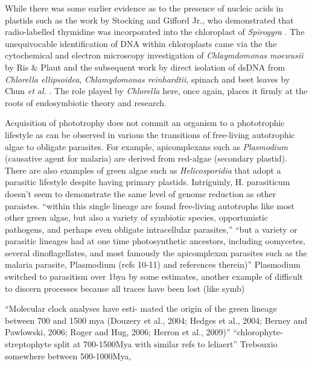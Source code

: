 While there was some earlier evidence as to the presence of nucleic acids in 
plastids such as the work by Stocking and Gifford Jr., who demonstrated that
radio-labelled thymidine was incorporated into the chloroplast of \textit{Spirogyra}
\citep{Stocking1959}.
The unequivocable identification of DNA within chloroplasts came via the 
the cytochemical and electron microscopy investigation of \textit{Chlaymdomonas moewusii} 
by Ris \& Plaut \citep{Ris1962} and the subsequent work by direct isolation of
dsDNA from \textit{Chlorella ellipsoidea}, \textit{Chlamydomonas reinhardtii}, spinach
and beet leaves by Chun \textit{et al.} \citep{Chun1963}. The role played by
\textit{Chlorella} here, once again, places it firmly at the roots of endosymbiotic
theory and research.



Acquisition of phototrophy does not commit an organism to a phototrophic lifestyle
as can be observed in various the transitions of free-living autotrophic algae 
to obligate parasites.  For example, apicomplexans such as \textit{Plasmodium} 
(causative agent for malaria) are derived from red-algae (secondary plastid).
There are also examples of green algae such as \textit{Helicosporidia} that 
adopt a parasitic lifestyle despite having primary plastids. 
Intriguinly, H. parasiticum doesn't seem to demonstrate the same level of
genome reduction as other paraistes.\citep{Pombert2014}
``within this single lineage are found free-living autotrophs like most
other green algae, but also a variety of symbiotic species,
opportunistic pathogens, and perhaps even obligate intracellular
parasites,''
``but a variety or parasitic lineages
had at one time photosynthetic ancestors, including oomycetes,
several dinoflagellates, and most famously the apicomplexan
parasites such as the malaria parasite, Plasmodium (refs 10-11)
and references therein)''
\citep{Pombert2014}
Plasmodium switched to parasitism over 1bya by some estimates, another example
of difficult to discern processes because all traces have been lost (like symb)



``Molecular clock analyses have esti- mated the origin of the green lineage between 700 and 1500 mya (Douzery et al., 2004; Hedges et al., 2004; Berney and Pawlowski, 2006; Roger and Hug, 2006; Herron et al., 2009)''
\citep{Leliaert2012}
``chlorophyte-streptophyte split at 700-1500Mya with similar refs to leliaert'' \citep{DeWever2009}
Trebouxio somewhere between 500-1000Mya, \citep{DeWever2009}



